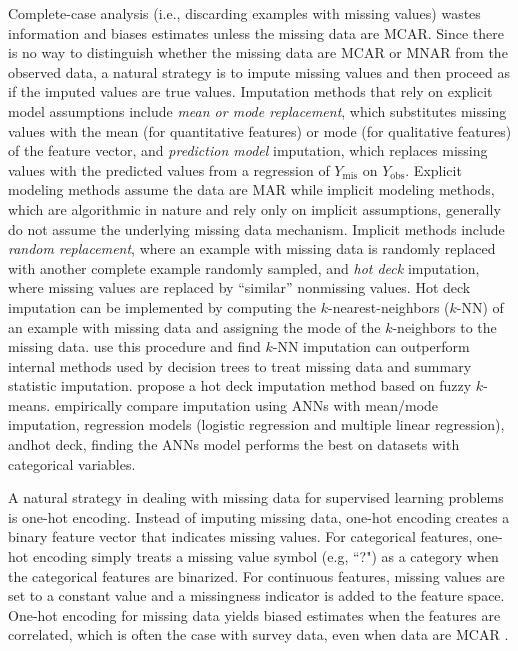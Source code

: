 \documentclass[10pt]{book}
\theoremstyle{definition}
\begin{document}
Complete-case analysis (i.e., discarding examples with missing values) wastes information and biases estimates unless the missing data are MCAR. Since there is no way to distinguish whether the missing data are MCAR or MNAR from the observed data, a natural strategy is to impute missing values and then proceed as if the imputed values are true values. Imputation methods that rely on explicit model assumptions include \emph{mean or mode replacement}, which substitutes missing values with the mean (for quantitative features) or mode (for qualitative features) of the feature vector, and \emph{prediction model} imputation, which replaces missing values with the predicted values from a regression of $Y_{\mathrm{mis}}$ on $Y_{\mathrm{obs}}$. Explicit modeling methods assume the data are MAR while implicit modeling methods, which are algorithmic in nature and rely only on implicit assumptions, generally do not assume the underlying missing data mechanism. Implicit methods include \emph{random replacement}, where an example with missing data is randomly replaced with another complete example randomly sampled, and \emph{hot deck} imputation, where missing values are replaced by ``similar'' nonmissing values. Hot deck imputation can be implemented by computing the $k$-nearest-neighbors ($k$-NN) of an example with missing data and assigning the mode of the $k$-neighbors to the missing data. \cite{batista2003analysis} use this procedure and find $k$-NN imputation can outperform internal methods used by decision trees to treat missing data and summary statistic imputation. \cite{li2004} propose a hot deck imputation method based on fuzzy $k$-means. \cite{silva2011} empirically compare imputation using ANNs with mean/mode imputation, regression models (logistic regression and multiple linear regression), andhot deck, finding the ANNs model performs the best on datasets with categorical variables. 

\par
{} 

A natural strategy in dealing with missing data for supervised learning problems is one-hot encoding. Instead of imputing missing data, one-hot encoding creates a binary feature vector that indicates missing values. For categorical features, one-hot encoding simply treats a missing value symbol (e.g, ``?") as a category when the categorical features are binarized. For continuous features, missing values are set to a constant value and a missingness indicator is added to the feature space. One-hot encoding for missing data yields biased estimates when the features are correlated, which is often the case with survey data, even when data are MCAR \citep{jones1996}. 
\end{document}
